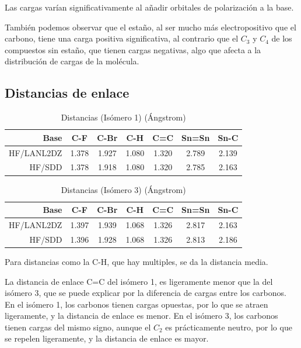 \documentclass[12pt]{article}
\begin{document}
Las cargas varían significativamente al añadir orbitales de polarización a la base.

También podemos observar que el estaño, al ser mucho más electropositivo que el carbono, tiene una carga positiva significativa, al contrario que el $C_3$ y $C_4$ de los compuestos sin estaño, que tienen cargas negativas, algo que afecta a la distribución de cargas de la molécula.






\subsection{Distancias de enlace}
\begin{table}[H]
\centering
    \begin{tabular}{rcccccc}
        \hline
        Base & C-F & C-Br & C-H & C=C & Sn=Sn & Sn-C \\
        \hline
        HF/LANL2DZ  & 1.378 & 1.927 & 1.080 & 1.320 & 2.789 & 2.139 \\
        HF/SDD      & 1.378 & 1.918 & 1.080 & 1.320 & 2.785 & 2.163 \\
        \hline
    \end{tabular}
    \caption{Distancias (Isómero 1) (Ángstrom)}
\end{table}

\begin{table}[H]
\centering
    \begin{tabular}{rcccccc}
        \hline
        Base & C-F & C-Br & C-H & C=C & Sn=Sn & Sn-C \\
        \hline
        HF/LANL2DZ   & 1.397 & 1.939 & 1.068 & 1.326 & 2.817 & 2.163 \\
        HF/SDD       & 1.396 & 1.928 & 1.068 & 1.326 & 2.813 & 2.186 \\
        \hline
    \end{tabular}
    \caption{Distancias (Isómero 3) (Ángstrom)}
\end{table}
Para distancias como la C-H, que hay multiples, se da la distancia media.

La distancia de enlace C=C del isómero 1, es ligeramente menor que la del isómero 3, que se puede explicar por la diferencia de cargas entre los carbonos. En el isómero 1, los carbonos tienen cargas opuestas, por lo que se atraen ligeramente, y la distancia de enlace es menor. En el isómero 3, los carbonos tienen cargas del mismo signo, aunque el $C_2$ es prácticamente neutro, por lo que se repelen ligeramente, y la distancia de enlace es mayor.
\end{document}
